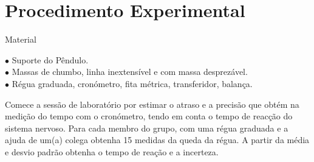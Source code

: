 \documentclass[a4paper,12pt]{article}      %
\newcommand{\HRule}{\rule{\linewidth}{0.5mm}}
\begin{document}


	
	

\section*{\sf Procedimento Experimental}
{ \large Material }
 \begin{flushleft}
	 $\bullet$ Suporte do Pêndulo. \\
	 $\bullet$ Massas de chumbo, linha inextensível e com massa desprezável. \\
	 $\bullet$ Régua graduada, cronómetro, fita métrica, transferidor, balança.
\end{flushleft} 

Comece a sessão de laboratório por estimar o atraso e a precisão que obtém na medição do tempo com o cronómetro, tendo em conta 
o tempo de reacção do sistema nervoso. 
Para cada membro do grupo, com  uma régua graduada e a ajuda de um(a) colega obtenha 15 medidas da queda da régua. A partir da média e desvio padrão obtenha o  tempo de reação  e a incerteza. 

\end{document}
